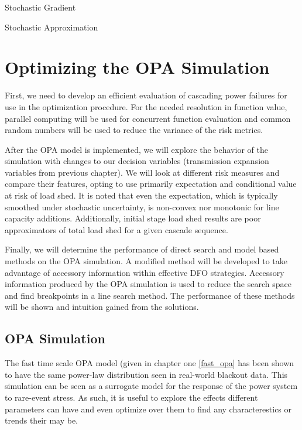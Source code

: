 Stochastic Gradient \endnote{}

Stochastic Approximation \endnote{}





\section{Optimizing the OPA Simulation}

First, we need to develop an efficient evaluation of cascading power failures for use in the optimization procedure.  For the needed resolution in function value, parallel computing will be used for concurrent function evaluation and common random numbers will be used to reduce the variance of the risk metrics.

After the OPA model is implemented, we will explore the behavior of the simulation with changes to our decision variables (transmission expansion variables from previous chapter).  We will look at different risk measures and compare their features, opting to use primarily expectation and conditional value at risk of load shed.  It is noted that even the expectation, which is typically smoothed under stochastic uncertainty, is non-convex nor monotonic for line capacity additions.  Additionally, initial stage load shed results are poor approximators of total load shed for a given cascade sequence.

Finally, we will determine the performance of direct search and model based methods on the OPA simulation.  A modified method will be developed to take advantage of accessory information within effective DFO strategies.  Accessory information produced by the OPA simulation is used to reduce the search space and find breakpoints in a line search method.  The performance of these methods will be shown and intuition gained from the solutions.

\subsection*{OPA Simulation}

The fast time scale OPA model (given in chapter one \ref{fast_opa} has been shown to have the same power-law distribution seen in real-world blackout data.  This simulation can be seen as a surrogate model for the response of the power system to rare-event stress.  As such, it is useful to explore the effects different parameters can have and even optimize over them to find any characterestics or trends their may be.

